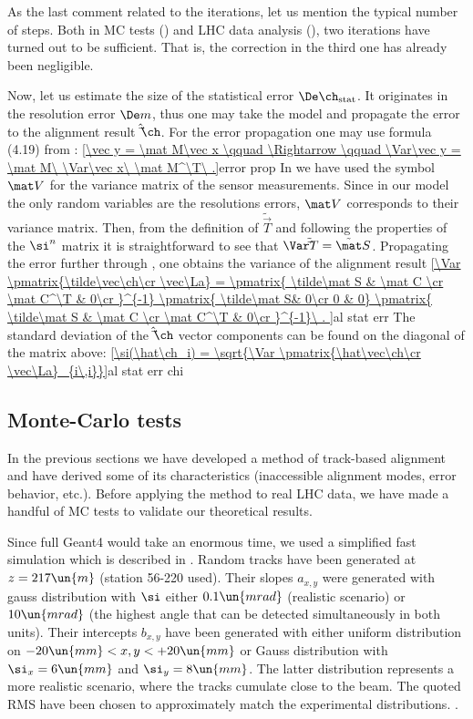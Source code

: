 As the last comment related to the iterations, let us mention the typical number of steps. Both in MC tests () and LHC data analysis (), two iterations have turned out to be sufficient. That is, the correction in the third one has already been negligible.

Now, let us estimate the size of the statistical error $\De\ch_{\rm stat}$. It originates in the resolution error $\De m$, thus one may take the model  and propagate the error to the alignment result $\hat\vec\ch$. For the error propagation one may use formula (4.19) from :
\eqref{\vec y = \mat M\vec x \qquad \Rightarrow \qquad \Var\vec y = \mat M\ \Var\vec x\ \mat M^\T\ .}{error prop}
In  we have used the symbol $\mat V$ for the variance matrix of the sensor measurements. Since in our model the only random variables are the resolutions errors, $\mat V$ corresponds to their variance matrix. Then, from the definition of $\tilde\vec T$  and following the properties of the $\si^n$ matrix  it is straightforward to see that $\Var \tilde\vec T = \tilde\mat S$. Propagating the error further through , one obtains the variance of the alignment result
\eqref{\Var \pmatrix{\tilde\vec\ch\cr \vec\La} = 
	\pmatrix{
		\tilde\mat S & \mat C \cr
		\mat C^\T & 0\cr
	}^{-1}
	\pmatrix{
		\tilde\mat S& 0\cr
		0 & 0}
	\pmatrix{
		\tilde\mat S & \mat C \cr
		\mat C^\T & 0\cr
	}^{-1}\ .
}{al stat err}
The standard deviation of the $\hat\vec\ch$ vector components can be found on the diagonal of the matrix above:
\eqref{\si(\hat\ch_i) = \sqrt{\Var \pmatrix{\hat\vec\ch\cr  \vec\La}_{i\,i}}}{al stat err chi}



\subsection[al mc tests]{Monte-Carlo tests}

In the previous sections we have developed a method of track-based alignment and have derived some of its characteristics (inaccessible alignment modes, error behavior, etc.). Before applying the method to real LHC data, we have made a handful of MC tests to validate our theoretical results.

Since full Geant4 would take an enormous time, we used a simplified fast simulation which is described in . Random tracks have been generated at $z=217\un{m}$ (station 56-220 used). Their slopes $a_{x, y}$ were generated with gauss distribution with $\si$ either $0.1\un{mrad}$ (realistic scenario) or $10\un{mrad}$ (the highest angle that can be detected simultaneously in both units). Their intercepts $b_{x, y}$ have been generated with either uniform distribution on $ -20\un{mm} < x, y < +20\un{mm}$ or Gauss distribution with $\si_x = 6\un{mm}$ and $\si_y = 8\un{mm}$. The latter distribution represents a more realistic scenario, where the tracks cumulate close to the beam. The quoted RMS have been chosen to approximately match the experimental distributions. . 


